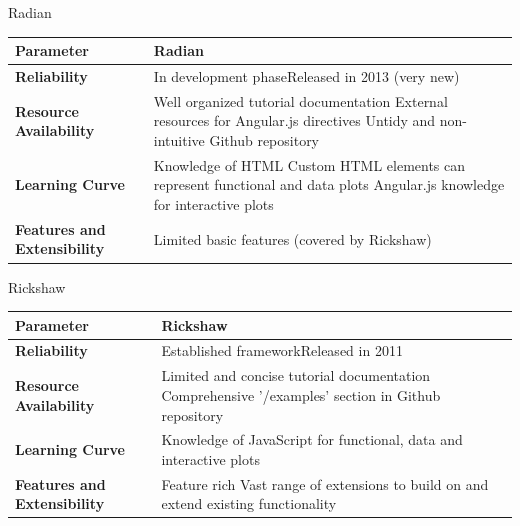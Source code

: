 \documentclass{beamer}
\begin{document}
\begin{frame}{Radian}
\begin{tabular}{| p{2.5cm} | p{8cm} |}
    \hline
     \textbf{Parameter} & \textbf{Radian} \\ \hline
  \textbf{Reliability} \newline & In development phase\newline Released in 2013 (very new) \\ \hline
  \textbf{Resource \newline Availability} &  Well organized tutorial documentation
		\newline External resources for Angular.js directives 
		\newline Untidy and non-intuitive Github repository \\ \hline
  \textbf{Learning Curve} &  Knowledge of HTML
		\newline Custom HTML elements can represent functional and data plots
		\newline Angular.js knowledge for interactive plots \\ \hline
\textbf{Features and Extensibility}& Limited basic features (covered by Rickshaw) \\ \hline
\end{tabular}
\end{frame}

\begin{frame}{Rickshaw}
\begin{tabular}{| p{2.5cm} | p{8cm} |}
    \hline
     \textbf{Parameter} & \textbf{Rickshaw} \\ \hline
\textbf{Reliability}\newline & Established framework\newline Released in 2011 \\ \hline
\textbf{Resource \newline Availability} &  Limited and concise tutorial documentation
		\newline Comprehensive '/examples' section in Github repository\\ \hline
\textbf{Learning Curve}  &  Knowledge of JavaScript for functional, data and interactive plots \\ \hline
\textbf{Features and Extensibility} & Feature rich
		\newline Vast range of extensions to build on and extend existing functionality\\ \hline
\end{tabular}
\end{frame}
\end{document}
